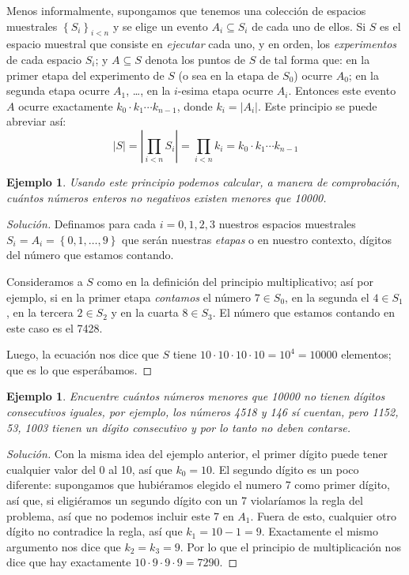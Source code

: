 \documentclass[spanish]{report}
\newtheorem{ejm}[thm]{Ejemplo}
\newcommand{\card}[1]{\left|#1 \right|}
\begin{document}
Menos informalmente, supongamos que tenemos una colección de espacios muestrales $\left\lbrace S_i \right\rbrace_{i<n}$ y se elige un evento $A_i \subseteq S_i$ de cada uno de ellos. 
Si $S$ es el espacio muestral que consiste en \emph{ejecutar} %
cada uno, y en orden, los \emph{experimentos} de cada espacio $S_i$; y $A \subseteq S$ denota los puntos de $S$ de tal forma que: en la primer etapa del experimento de $S$ (o sea en la etapa de $S_0$) ocurre $A_0$; en la segunda etapa ocurre $A_1$, \ldots, en la $i$-esima etapa ocurre $A_i$. Entonces este evento $A$ ocurre exactamente $k_0 \cdotp k_1 \cdots k_{n-1}$, donde $k_i= \card{A_i}$.
Este principio se puede abreviar así:
\begin{equation}\label{eq_PrincipioMultiplicativo}
	\card{S} = \card{\prod_{i<n} S_i} = \prod_{i<n}k_i = k_0 \cdotp k_1 \cdots k_{n-1}
\end{equation}

\begin{ejm}\label{ejm_numerosMenorQue}
	Usando este principio podemos calcular, a manera de comprobación, cuántos números enteros no negativos existen menores que 10000.
\end{ejm}
\begin{proof}[Solución]
Definamos para cada $i=0,1,2,3$ nuestros espacios muestrales $S_i = A_i= \left\lbrace 0,1, \ldots,9 \right\rbrace$ que serán nuestras \emph{etapas} o en nuestro contexto, dígitos del número que estamos contando. %

Consideramos a $S$ como en la definición del principio multiplicativo; así por ejemplo, si en la primer etapa \emph{contamos} el número $7 \in S_0$, en la segunda el $4 \in S_1$, en la tercera $2 \in S_2$ y en la cuarta $8 \in S_3$. El número que estamos contando en este caso es el 7428.

Luego, la ecuación nos dice que $S$ tiene $10 \cdotp 10\cdotp 10 \cdotp 10 = 10^4 = 10000$ elementos; que es lo que esperábamos.
\end{proof}
\begin{ejm}
	Encuentre cuántos números menores que 10000 no tienen dígitos consecutivos iguales, por ejemplo, los números 4518 y 146 sí cuentan, pero 1152, 53, 1003 tienen un dígito consecutivo y por lo tanto no deben contarse.
\end{ejm}
\begin{proof}[Solución]
	Con la misma idea del ejemplo anterior, el primer dígito puede tener cualquier valor del 0 al 10, así que $k_0 = 10$. El segundo dígito es un poco diferente: supongamos que hubiéramos elegido el numero 7 como primer dígito, así que, si eligiéramos un segundo dígito con un 7 violaríamos la regla del problema, así que no podemos incluir este 7 en $A_1$. Fuera de esto, cualquier otro dígito no contradice la regla, así que $k_1 = 10 - 1 = 9$. 
Exactamente el mismo argumento nos dice que $k_2 = k_3 = 9$.
Por lo que el principio de multiplicación nos dice que hay exactamente $10 \cdotp 9 \cdotp 9 \cdotp 9 = 7290$.
\end{proof}
\end{document}
